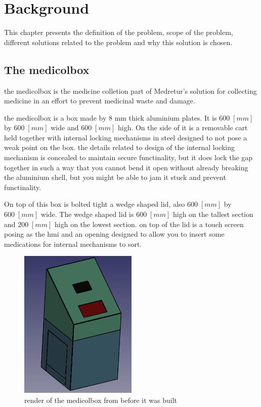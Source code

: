 \documentclass[../main.tex]{subfiles}
\begin{document}
\pagebreak
\section{Background}

This chapter presents the definition of the problem,
scope of the problem,
different solutions related to the problem and
why this solution is chosen.

\subsection{The \gls{medicolbox}}

the \gls{medicolbox} is the medicine colletion part of Medretur’s solution for collecting medicine in an effort to prevent medicinal waste and damage.

the \gls{medicolbox} is a box made by $8$ mm thick aluminium plates. It is $600\;[mm]$ by $600\;[mm]$ wide and $600\;[mm]$ high.
On the side of it is a removable cart held together with internal locking mechanisms in steel designed to not pose a weak point on the box.
the details related to design of the internal locking mechanism is concealed to maintain secure functinality, but it does lock the gap together in such a way that you cannot bend it open without already breaking the aluminium shell, but you might be able to jam it stuck and prevent functinality.

On top of this box is bolted tight a wedge shaped lid, also $600\;[mm]$ by $600\;[mm]$ wide.
The wedge shaped lid is $600\;[mm]$ high on the tallest section and $200\;[mm]$ high on the lowest section.
on top of the lid is a touch screen posing as the \gls{hmi} and an opening designed to allow you to insert some medications for internal mechanisms to sort.

\begin{figure}[htbp]
    \centering
    \includegraphics[width=0.5\textwidth]
    {resources/images/MediColBox.png}
    \caption{render of the \gls{medicolbox} from before it was built}
    \label{fig:medicolbox_render}
\end{figure}
\end{document}
